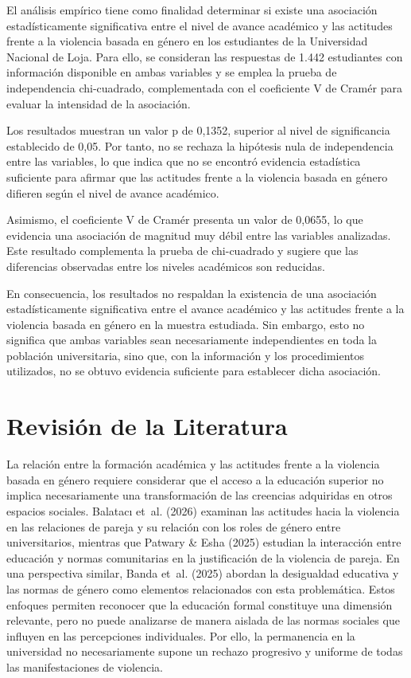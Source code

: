 \documentclass[
  spanish,
  11pt,
  letterpaper,
  DIV=11,
  numbers=noendperiod]{scrreprt}
\begin{document}
El análisis empírico tiene como finalidad determinar si existe una
asociación estadísticamente significativa entre el nivel de avance
académico y las actitudes frente a la violencia basada en género en los
estudiantes de la Universidad Nacional de Loja. Para ello, se consideran
las respuestas de 1.442 estudiantes con información disponible en ambas
variables y se emplea la prueba de independencia chi-cuadrado,
complementada con el coeficiente V de Cramér para evaluar la intensidad
de la asociación.

Los resultados muestran un valor p de 0,1352, superior al nivel de
significancia establecido de 0,05. Por tanto, no se rechaza la hipótesis
nula de independencia entre las variables, lo que indica que no se
encontró evidencia estadística suficiente para afirmar que las actitudes
frente a la violencia basada en género difieren según el nivel de avance
académico.

Asimismo, el coeficiente V de Cramér presenta un valor de 0,0655, lo que
evidencia una asociación de magnitud muy débil entre las variables
analizadas. Este resultado complementa la prueba de chi-cuadrado y
sugiere que las diferencias observadas entre los niveles académicos son
reducidas.

En consecuencia, los resultados no respaldan la existencia de una
asociación estadísticamente significativa entre el avance académico y
las actitudes frente a la violencia basada en género en la muestra
estudiada. Sin embargo, esto no significa que ambas variables sean
necesariamente independientes en toda la población universitaria, sino
que, con la información y los procedimientos utilizados, no se obtuvo
evidencia suficiente para establecer dicha asociación.


\chapter{Revisión de la Literatura}\label{revisiuxf3n-de-la-literatura}

La relación entre la formación académica y las actitudes frente a la
violencia basada en género requiere considerar que el acceso a la
educación superior no implica necesariamente una transformación de las
creencias adquiridas en otros espacios sociales. Balatacı et~al. (2026)
examinan las actitudes hacia la violencia en las relaciones de pareja y
su relación con los roles de género entre universitarios, mientras que
Patwary \& Esha (2025) estudian la interacción entre educación y normas
comunitarias en la justificación de la violencia de pareja. En una
perspectiva similar, Banda et~al. (2025) abordan la desigualdad
educativa y las normas de género como elementos relacionados con esta
problemática. Estos enfoques permiten reconocer que la educación formal
constituye una dimensión relevante, pero no puede analizarse de manera
aislada de las normas sociales que influyen en las percepciones
individuales. Por ello, la permanencia en la universidad no
necesariamente supone un rechazo progresivo y uniforme de todas las
manifestaciones de violencia.
\end{document}
